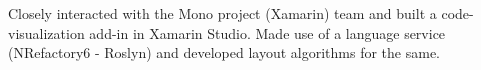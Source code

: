 \documentclass[]{resume-openfont}
\begin{document}
\begin{minipage}[t]{0.74\textwidth}
Closely interacted with the Mono project (Xamarin) team and built a code-visualization add-in in Xamarin Studio. Made use of a language service (NRefactory6 - Roslyn) and developed layout algorithms for the same.
\sectionsep







\end{minipage}
\end{document}
